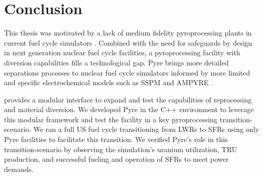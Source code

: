 \chapter{Conclusion}

This thesis was motivated by a lack of medium fidelity pyroprocessing plants in current fuel cycle simulators \cite{borrelli_approaches_2017}. Combined with 
the need for safeguards by design in next generation nuclear fuel cycle facilities, a pyroprocessing facility with diversion capabilities fills a technological gap.
Pyre brings more detailed separations processes to nuclear fuel cycle simulators informed by more limited and specific electrochemical models such as SSPM and AMPYRE \cite{maggos_update_2015}.

\Cyclus provides a modular interface to expand and test the capabilities of reprocessing and material diversion. We developed Pyre in the C++ \Cyclus environment to leverage this
modular framework and test the facility in a key pyroprocessing transition-scenario. We ran a full US fuel cycle transitioning from LWRs to SFRs using only Pyre facilities to facilitate
this transition. We verified Pyre's role in this transition-scenario by observing the simulation's uranium utilization, TRU production, and successful fueling and operation of SFRs to
meet power demands.